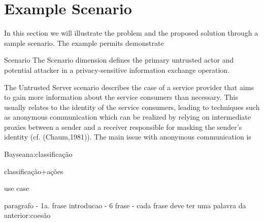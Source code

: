 \section{Example Scenario}

In this section we will illustrate the problem and the proposed solution through a sample scenario. The example permits demonstrate 

Scenario The Scenario dimension defines the primary untrusted actor and potential attacker in a privacy-sensitive information exchange operation.

The Untrusted Server scenario describes the case of a service provider that aims to gain more information about the service
consumers than necessary. This usually relates to the identity of the service consumers, leading to techniques such as
anonymous communication which can be realized by relying on intermediate proxies between a sender and a receiver
responsible for masking the sender's identity (cf. (Chaum,1981)). The main issue with anonymous communication is



Bayseana:classificação

classificação+ações

use case

paragrafo
- 1a. frase introducao
- 6 frase
- cada frase deve ter uma palavra da anterior:coesão
